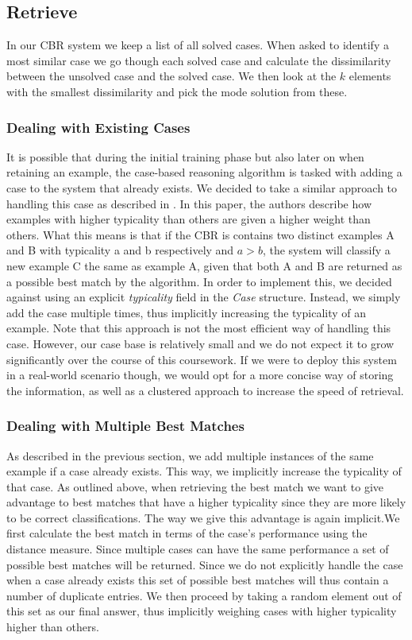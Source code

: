 \documentclass[10pt,a4paper]{article}
\begin{document}
\subsection{Retrieve}
In our CBR system we keep a list of all solved cases.
When asked to identify a most similar case we go though each solved case and calculate the dissimilarity between the unsolved case and the solved case.
We then look at the $k$ elements with the smallest dissimilarity and pick the mode solution from these.

\subsubsection{Dealing with Existing Cases}
It is possible that during the initial training phase but also later on when retaining an example, the case-based reasoning algorithm is tasked with adding a case to the system that already exists. We decided to take a similar approach to handling this case as described in \cite{Pantic2004}. In this paper, the authors describe how examples with higher typicality than others are given a higher weight than others. What this means is that if the CBR is contains two distinct examples A and B with typicality a and b respectively and $a > b$, the system will classify a new example C the same as example A, given that both A and B are returned as a possible best match by the algorithm.
In order to implement this, we decided against using an explicit \emph{typicality} field in the \emph{Case} structure. Instead, we simply add the case multiple times, thus implicitly increasing the typicality of an example. Note that this approach is not the most efficient way of handling this case. However, our case base is relatively small and we do not expect it to grow significantly over the course of this coursework. If we were to deploy this system in a real-world scenario though, we would opt for a more concise way of storing the information, as well as a clustered approach to increase the speed of retrieval.

\subsubsection{Dealing with Multiple Best Matches}
As described in the previous section, we add multiple instances of the same example if a case already exists. This way, we implicitly increase the typicality of that case. As outlined above, when retrieving the best match we want to give advantage to best matches that have a higher typicality since they are more likely to be correct classifications. The way we give this advantage is again implicit.We first calculate the best match in terms of the case's performance using the distance measure. Since multiple cases can have the same performance a set of possible best matches will be returned. Since we do not explicitly handle the case when a case already exists this set of possible best matches will thus contain a number of duplicate entries. We then proceed by taking a random element out of this set as our final answer, thus implicitly weighing cases with higher typicality higher than others.
\end{document}
